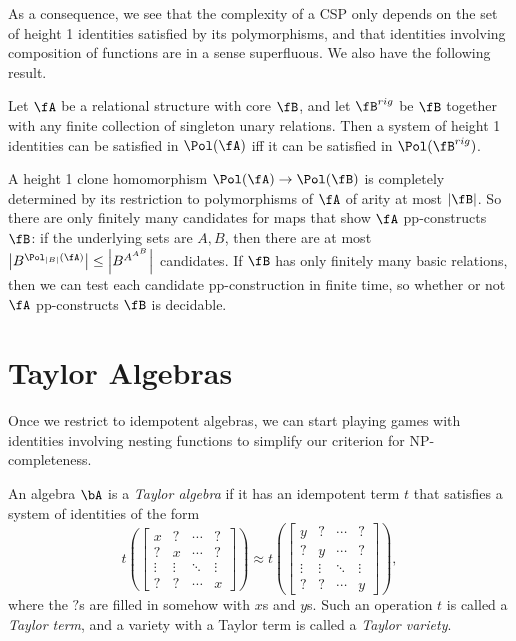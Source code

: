 As a consequence, we see that the complexity of a CSP only depends on the set of height 1 identities satisfied by its polymorphisms, and that identities involving composition of functions are in a sense superfluous. We also have the following result.

\begin{cor} Let $\fA$ be a relational structure with core $\fB$, and let $\fB^{rig}$ be $\fB$ together with any finite collection of singleton unary relations. Then a system of height 1 identities can be satisfied in $\Pol(\fA)$ iff it can be satisfied in $\Pol(\fB^{rig})$.
\end{cor}

\begin{rem} A height 1 clone homomorphism $\Pol(\fA) \rightarrow \Pol(\fB)$ is completely determined by its restriction to polymorphisms of $\fA$ of arity at most $|\fB|$. So there are only finitely many candidates for maps that show $\fA$ pp-constructs $\fB$: if the underlying sets are $A,B$, then there are at most $\left|B^{\Pol_{|B|}(\fA)}\right| \le \left|B^{A^{A^B}}\right|$ candidates. If $\fB$ has only finitely many basic relations, then we can test each candidate pp-construction in finite time, so whether or not $\fA$ pp-constructs $\fB$ is decidable.
\end{rem}


\section{Taylor Algebras}

Once we restrict to idempotent algebras, we can start playing games with identities involving nesting functions to simplify our criterion for NP-completeness.

\begin{defn} An algebra $\bA$ is a \emph{Taylor algebra} if it has an idempotent term $t$ that satisfies a system of identities of the form
\[
t\left(\begin{bmatrix} x & ? & \cdots & ? \\ ? & x & \cdots & ? \\ \vdots & \vdots & \ddots & \vdots \\ ? & ? & \cdots & x \end{bmatrix}\right) \approx t\left(\begin{bmatrix} y & ? & \cdots & ? \\ ? & y & \cdots & ? \\ \vdots & \vdots & \ddots & \vdots \\ ? & ? & \cdots & y \end{bmatrix}\right),
\]
where the $?$s are filled in somehow with $x$s and $y$s. Such an operation $t$ is called a \emph{Taylor term}, and a variety with a Taylor term is called a \emph{Taylor variety}.
\end{defn}

